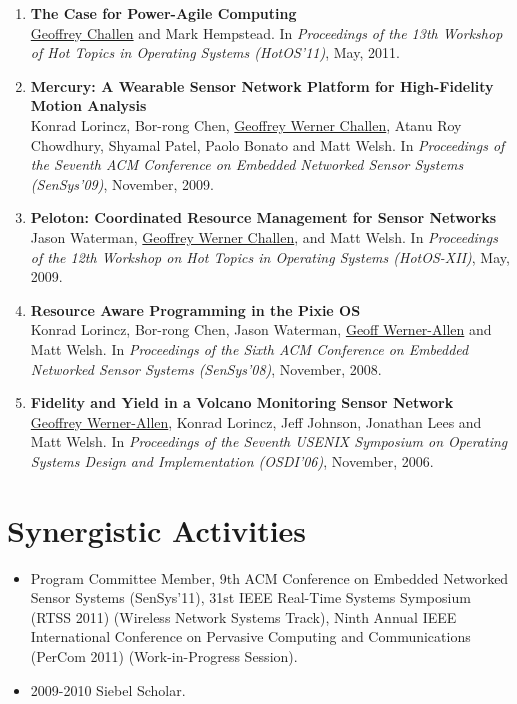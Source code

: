 \begin{enumerate}

\item \textbf{The Case for Power-Agile Computing}\\\uline{Geoffrey Challen}
and Mark Hempstead. In \emph{Proceedings of the 13th Workshop of Hot Topics
in Operating Systems (HotOS'11)}, May, 2011.
\nocite{poweragile-hotos11}

\item \textbf{Mercury: A Wearable Sensor Network Platform for High-Fidelity
Motion Analysis}\\ Konrad Lorincz, Bor-rong Chen, \uline{Geoffrey Werner
Challen}, Atanu Roy Chowdhury, Shyamal Patel, Paolo Bonato and Matt Welsh. In
\emph{Proceedings of the Seventh ACM Conference on Embedded Networked Sensor
Systems (SenSys’09)}, November, 2009.
\nocite{mercury-sensys09}

\item \textbf{Peloton: Coordinated Resource Management for Sensor Networks}\\
Jason Waterman, \uline{Geoffrey Werner Challen}, and Matt Welsh. In
\emph{Proceedings of the 12th Workshop on Hot Topics in Operating Systems
(HotOS-XII)}, May, 2009.
\nocite{peloton-hotos09}

\item \textbf{Resource Aware Programming in the Pixie OS}\\ Konrad Lorincz,
Bor-rong Chen, Jason Waterman, \uline{Geoff Werner-Allen} and Matt Welsh. In
\emph{Proceedings of the Sixth ACM Conference on Embedded Networked Sensor
Systems (SenSys’08)}, November, 2008.
\nocite{pixie-sensys08}

\item \textbf{Fidelity and Yield in a Volcano Monitoring Sensor Network}\\
\uline{Geoffrey Werner-Allen}, Konrad Lorincz, Jeff Johnson, Jonathan Lees and
Matt Welsh. In \emph{Proceedings of the Seventh USENIX Symposium on Operating
Systems Design and Implementation (OSDI’06)}, November, 2006.
\nocite{volcano-osdi06}

\end{enumerate}

\section{Synergistic Activities}

\begin{itemize}

\item Program Committee Member, 9th ACM Conference on Embedded Networked Sensor
Systems (SenSys'11), 31st IEEE Real-Time Systems Symposium (RTSS 2011)
(Wireless Network Systems Track), Ninth Annual IEEE International Conference on
Pervasive Computing and Communications (PerCom 2011) (Work-in-Progress
Session).
\item 2009-2010 Siebel Scholar.

\end{itemize}

